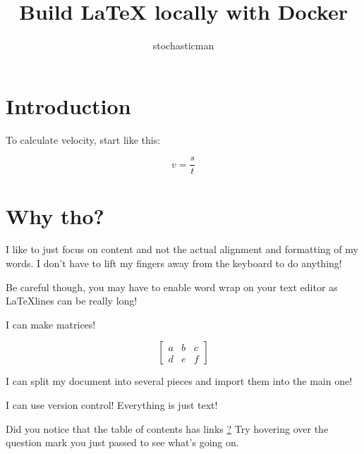 \documentclass[hidelinks,12pt]{article}
\begin{document}
\title{Build LaTeX locally with Docker}
\author{stochasticman}
\maketitle

\hypertarget{toc}{}
\tableofcontents

\section{Introduction}

To calculate velocity, start like this:

\begin{equation*}
v = \frac{s}{t}
\end{equation*}

\section{Why tho?}


I like to just focus on content and not the actual alignment and formatting of my words. I don't have to lift my fingers away from the keyboard to do anything! 

Be careful though, you may have to enable word wrap on your text editor as \LaTeX lines can be really long!

I can make matrices! 

\[
    \left[
        \begin{array}{ccc}
            a&b&c\\d&e&f    
        \end{array}
    \right]
\]

I can split my document into several pieces and import them into the main one!

I can use version control! Everything is just text!

Did you notice that the table of contents has links \hyperlink{toc}{?} Try hovering over the question mark you just passed to see what's going on.
\end{document}
